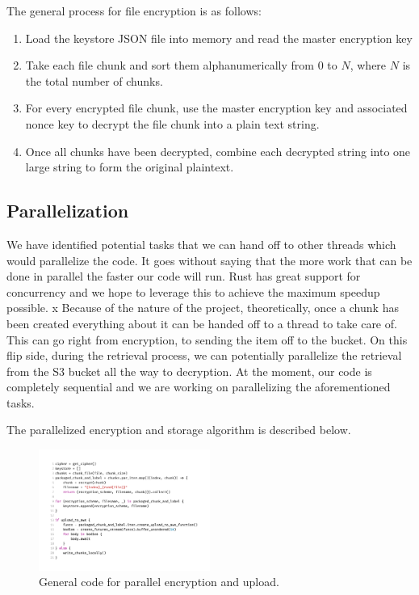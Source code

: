 \documentclass[conference]{IEEEtran}
\begin{document}
\medskip
\indent The general process for file encryption is as follows:
\begin{enumerate}
	\item Load the keystore JSON file into memory and read the master encryption key
	\item
		Take each file chunk and sort them alphanumerically from 0 to $N$, where
		$N$ is the total number of chunks.
	\item
		For every encrypted file chunk, use the master encryption key and associated
		nonce key to decrypt the file chunk into a plain text string.
	\item
		Once all chunks have been decrypted, combine each decrypted string into one
		large string to form the original plaintext.
\end{enumerate}

\subsection{Parallelization}

We have identified potential tasks that we can hand off to other threads which would parallelize the code.
It goes without saying that the more work that can be done in parallel the faster our code will run.
Rust has great support for concurrency and we hope to leverage this to achieve the maximum speedup possible.
x
Because of the nature of the project, theoretically, once a chunk has been created everything about it can be handed off to a thread to take care of.
This can go right from encryption, to sending the item off to the bucket.
On this flip side, during the retrieval process, we can potentially parallelize the retrieval from the S3 bucket all the way to decryption.
At the moment, our code is completely sequential and we are working on parallelizing the aforementioned tasks.

The parallelized encryption and storage algorithm is described below.

\begin{figure}[h]
	\caption{General code for parallel encryption and upload.}
	\centering
	\includegraphics[width=0.50\textwidth]{algo.png}
\end{figure}
\end{document}
